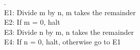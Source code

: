 \documentclass[12pt]{article}
\begin{document}
.\\
E1: Divide m by n, m takes the remainder\\
E2: If m = 0, halt\\
E3: Divide n by m, n takes the remainder\\
E4: If n = 0, halt, otherwise go to E1\\
\end{document}
